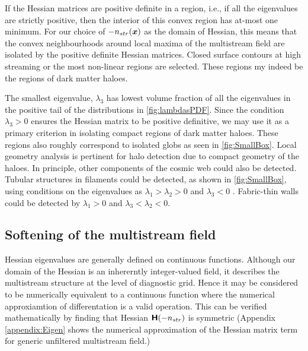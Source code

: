 \documentclass[fleqn,usenatbib,useAMS]{mnras}
\newcommand\hl{\bgroup\markoverwith
  {\textcolor{yellow}{\rule[-.5ex]{2pt}{2.5ex}}}\ULon}
\begin{document}
If the Hessian matrices are positive definite in a region, i.e., if all the eigenvalues are strictly positive, then the interior of this convex region has at-most one minimum. For our choice of $-n_{str}(\bmath{x})$ as the domain of Hessian, this means that the convex neighbourhoods around local maxima of the multistream field are isolated by the positive definite Hessian matrices. Closed surface contours at high streaming or the most non-linear regions are selected. These regions my indeed be the regions of dark matter haloes.

The smallest eigenvalue, $\lambda_3$ has lowest volume fraction of all the eigenvalues in the positive tail of the distributions in \autoref{fig:lambdasPDF}. Since the condition $\lambda_3 > 0$ ensures the Hessian matrix to be positive definitive, we may use it as a primary criterion in isolating compact regions of dark matter haloes. These regions also roughly correspond to isolated globs as seen in \autoref{fig:SmallBox}. Local geometry analysis is pertinent for halo detection due to compact geometry of the haloes. In principle, other components of the cosmic web could also be detected. Tubular structures in filaments could be detected, as shown in \autoref{fig:SmallBox}, using conditions on the eigenvalues as $\lambda_1 > \lambda_2 > 0$ and $ \lambda_3 < 0$ . Fabric-thin walls could be detected by $\lambda_1 > 0$ and $ \lambda_3 < \lambda_2 < 0$. 

\subsection{Softening of the multistream field}
\label{sub:Softening}


Hessian eigenvalues are generally defined on continuous functions. Although our domain of the Hessian is an inhererntly integer-valued field, it describes the multistream structure at the level of diagnostic grid. Hence it may be considered to be numerically equivalent to a continuous function where the numerical approxiamtion of differentation is a valid operation. This can be verified mathematically by finding that Hessian $\textbf{\textsf{H}}(-n_{str})$ is symmetric (Appendix \ref{appendix:Eigen} shows the numerical approximation of the Hessian matrix term for generic unfiltered multistream field.)
\end{document}
